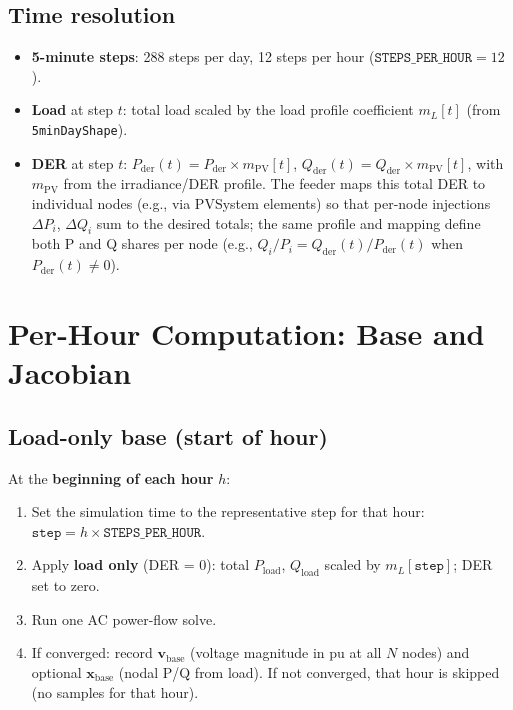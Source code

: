 \documentclass[11pt]{article}
\begin{document}
\subsection{Time resolution}

\begin{itemize}[noitemsep]
  \item \textbf{5-minute steps}: 288 steps per day, 12 steps per hour ($\mathtt{STEPS\_PER\_HOUR} = 12$).
  \item \textbf{Load} at step $t$: total load scaled by the load profile coefficient $m_L[t]$ (from \texttt{5minDayShape}).
  \item \textbf{DER} at step $t$: $P_{\mathrm{der}}(t) = P_{\mathrm{der}} \times m_{\mathrm{PV}}[t]$, $Q_{\mathrm{der}}(t) = Q_{\mathrm{der}} \times m_{\mathrm{PV}}[t]$, with $m_{\mathrm{PV}}$ from the irradiance/DER profile. The feeder maps this total DER to individual nodes (e.g., via PVSystem elements) so that per-node injections $\Delta P_i$, $\Delta Q_i$ sum to the desired totals; the same profile and mapping define both P and Q shares per node (e.g., $Q_i / P_i = Q_{\mathrm{der}}(t)/P_{\mathrm{der}}(t)$ when $P_{\mathrm{der}}(t) \neq 0$).
\end{itemize}

\section{Per-Hour Computation: Base and Jacobian}

\subsection{Load-only base (start of hour)}

At the \textbf{beginning of each hour} $h$:
\begin{enumerate}[noitemsep]
  \item Set the simulation time to the representative step for that hour: $\mathtt{step} = h \times \mathtt{STEPS\_PER\_HOUR}$.
  \item Apply \textbf{load only} (DER = 0): total $P_{\mathrm{load}}$, $Q_{\mathrm{load}}$ scaled by $m_L[\mathtt{step}]$; DER set to zero.
  \item Run one AC power-flow solve.
  \item If converged: record $\mathbf{v}_{\mathrm{base}}$ (voltage magnitude in pu at all $N$ nodes) and optional $\mathbf{x}_{\mathrm{base}}$ (nodal P/Q from load). If not converged, that hour is skipped (no samples for that hour).
\end{enumerate}
\end{document}
